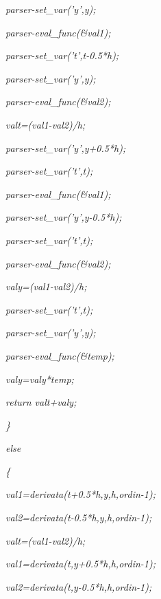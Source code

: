 \documentclass[a4paper,twoside]{book}
\begin{document}
\textit{\qquad \qquad \qquad parser-\TEXTsymbol{>}set\_var('y',y);}

\textit{\qquad \qquad \qquad parser-\TEXTsymbol{>}eval\_func(\&val1);}

\textit{\qquad \qquad \qquad parser-\TEXTsymbol{>}set\_var('t',t-0.5*h);}

\textit{\qquad \qquad \qquad parser-\TEXTsymbol{>}set\_var('y',y);}

\textit{\qquad \qquad \qquad parser-\TEXTsymbol{>}eval\_func(\&val2);}

\textit{\qquad \qquad \qquad valt=(val1-val2)/h;}

\textit{\qquad \qquad \qquad parser-\TEXTsymbol{>}set\_var('y',y+0.5*h);}

\textit{\qquad \qquad \qquad parser-\TEXTsymbol{>}set\_var('t',t);}

\textit{\qquad \qquad \qquad parser-\TEXTsymbol{>}eval\_func(\&val1);}

\textit{\qquad \qquad \qquad parser-\TEXTsymbol{>}set\_var('y',y-0.5*h);}

\textit{\qquad \qquad \qquad parser-\TEXTsymbol{>}set\_var('t',t);}

\textit{\qquad \qquad \qquad parser-\TEXTsymbol{>}eval\_func(\&val2);}

\textit{\qquad \qquad \qquad valy=(val1-val2)/h;}

\textit{\qquad \qquad \qquad parser-\TEXTsymbol{>}set\_var('t',t);}

\textit{\qquad \qquad \qquad parser-\TEXTsymbol{>}set\_var('y',y);}

\textit{\qquad \qquad \qquad parser-\TEXTsymbol{>}eval\_func(\&temp);}

\textit{\qquad \qquad \qquad valy=valy*temp;}

\textit{\qquad \qquad \qquad return valt+valy;}

\textit{\qquad \}}

\textit{\qquad else}

\textit{\qquad \{}

\textit{\qquad \qquad \qquad val1=derivata(t+0.5*h,y,h,ordin-1);}

\textit{\qquad \qquad \qquad val2=derivata(t-0.5*h,y,h,ordin-1);}

\textit{\qquad \qquad \qquad valt=(val1-val2)/h;}

\textit{\qquad \qquad \qquad val1=derivata(t,y+0.5*h,h,ordin-1);}

\textit{\qquad \qquad \qquad val2=derivata(t,y-0.5*h,h,ordin-1);}
\end{document}
